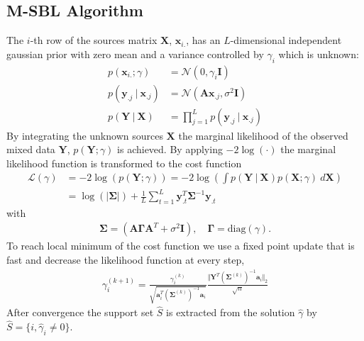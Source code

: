 \subsection{M-SBL Algorithm}
The $i$-th row of the sources matrix $\mathbf{X}$, $\mathbf{x}_{i.}$, has an $L$-dimensional independent gaussian prior with zero mean and a variance controlled by $\gamma_i$ which is unknown:
\begin{align*}
p (\mathbf{x}_{i.} ; \gamma) &= \mathcal{N}(0, \gamma_i \mathbf{I}) \\
p (\mathbf{y}_{.j} \ \vert \ \mathbf{x}_{.j}) &= \mathcal{N}(\mathbf{Ax}_{.j}, \sigma^2 \mathbf{I}) \\
p (\mathbf{Y} \ \vert \ \mathbf{X}) &= \prod_{j=1}^L p (\mathbf{y}_{.j} \ \vert \ \mathbf{x}_{.j})
\end{align*}
By integrating the unknown sources $\mathbf{X}$ the marginal likelihood of the observed mixed data $\mathbf{Y}$, $p (\mathbf{Y} ; \gamma)$ is achieved. By applying $-2 \log (\cdot)$ the marginal likelihood function is transformed to the cost function
\begin{align*}
\mathcal{L}(\gamma) &= - 2 \log(p (\mathbf{Y} ; \gamma)) = -2 \log \left( \int p (\mathbf{Y} \ \vert \ \mathbf{X}) p (\mathbf{X} ; \gamma) \ d\mathbf{X} \right) \\
&= \log ( \vert \boldsymbol{\Sigma} \vert) + \frac{1}{L} \sum_{t=1}^L \mathbf{y}_{.t}^T \boldsymbol{\Sigma}^{-1} \mathbf{y}_{.t}
\end{align*}
with
\begin{align*}
\boldsymbol{\Sigma} = (\mathbf{A} \boldsymbol{\Gamma} \mathbf{A}^T + \sigma^2 \mathbf{I}), \quad \boldsymbol{\Gamma} = \text{diag}(\gamma).
\end{align*}
To reach local minimum of the cost function we use a fixed point update that is fast and decrease the likelihood function at every step,
\begin{align*}
\gamma_i^{(k+1)} = \frac{\gamma_i^{(k)}}{\sqrt{\mathbf{a}_i^T (\boldsymbol{\Sigma}^{(k)})^{-1} \mathbf{a}_i}} \frac{\Vert \mathbf{Y}^T (\boldsymbol{\Sigma}^{(k)})^{-1} \mathbf{a}_i \Vert_2}{\sqrt{n}}
\end{align*}
After convergence the support set $\hat{S}$ is extracted from the solution $\hat{\gamma}$ by $\hat{S} = \{ i, \hat{\gamma}_i \neq 0 \}$.


